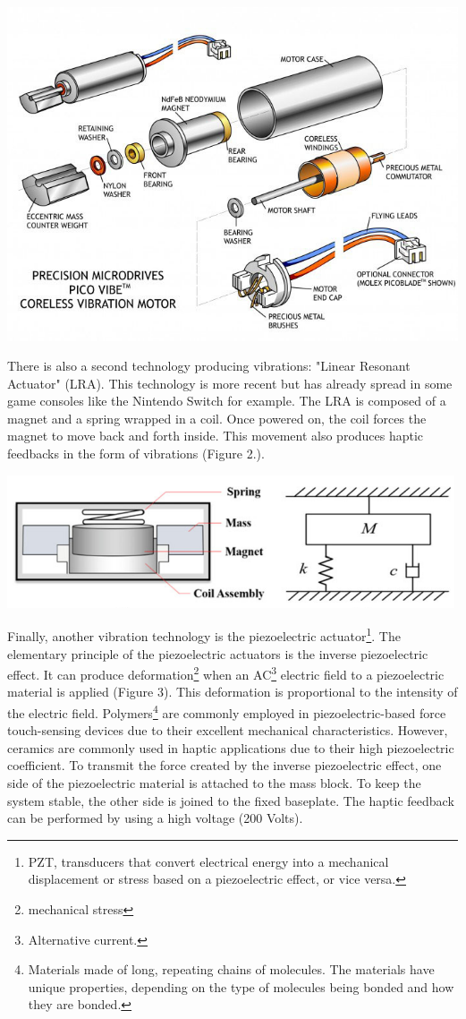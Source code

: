 \documentclass[12pt, a4paper]{article}
\begin{document}
\begin{multicols}{2}
\captionsetup{type=figure}
\centering
\includegraphics[width=.4\textwidth, ]{ERM.jpg}
\vspace*{3mm}

\justifying

\par There is also a second technology producing vibrations: "Linear Resonant Actuator" (LRA). This technology is more recent but has already spread in some game consoles like the Nintendo Switch for example. The LRA is composed of a magnet and a spring wrapped in a coil. Once powered on, the coil forces the magnet to move back and forth inside. This movement also produces haptic feedbacks in the form of vibrations\cite{TBHMI} (Figure 2.).

\captionsetup{type=figure}
\includegraphics[width=.49\textwidth]{LRA.png}
\vspace*{3mm}

\par Finally, another vibration technology is the piezoelectric actuator\footnote{PZT, transducers that convert electrical energy into a mechanical displacement or stress based on a piezoelectric effect, or vice versa.}. The elementary principle of the piezoelectric actuators is the inverse piezoelectric effect. It can produce deformation\footnote{mechanical stress} when an AC\footnote{Alternative current.} electric field to a piezoelectric material is applied (Figure 3). This deformation is proportional to the intensity of the electric field. Polymers\footnote{Materials made of long, repeating chains of molecules. The materials have unique properties, depending on the type of molecules being bonded and how they are bonded.} are commonly employed in piezoelectric-based force touch-sensing devices due to their excellent mechanical characteristics. However, ceramics are commonly used in haptic applications due to their high piezoelectric coefficient. To transmit the force created by the inverse piezoelectric effect, one side of the piezoelectric material is attached to the mass block. To keep the system stable, the other side is joined to the fixed baseplate. The haptic feedback can be performed by using a high voltage (200 Volts)\cite{TBHMI}.


\end{multicols}
\end{document}
